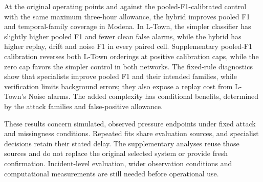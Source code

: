 At the original operating points and against the pooled-F1-calibrated control with the same maximum three-hour allowance, the hybrid improves pooled F1 and temporal-family coverage in Modena. In L-Town, the simpler classifier has slightly higher pooled F1 and fewer clean false alarms, while the hybrid has higher replay, drift and noise F1 in every paired cell. Supplementary pooled-F1 calibration reverses both L-Town orderings at positive calibration caps, while the zero cap favors the simpler control in both networks. The fixed-rule diagnostics show that specialists improve pooled F1 and their intended families, while verification limits background errors; they also expose a replay cost from L-Town's Noise alarms. The added complexity has conditional benefits, determined by the attack families and false-positive allowance.

These results concern simulated, observed pressure endpoints under fixed attack and missingness conditions. Repeated fits share evaluation sources, and specialist decisions retain their stated delay. The supplementary analyses reuse those sources and do not replace the original selected system or provide fresh confirmation. Incident-level evaluation, wider observation conditions and computational measurements are still needed before operational use.
